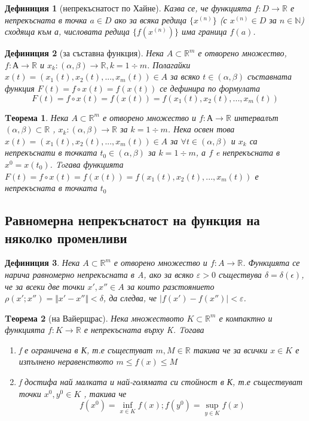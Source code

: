 \documentclass[fleqn,12pt]{article}
\newtheorem{theorem}{Tеорема}[subsection]
\newtheorem{definition}{Дефиниция}[subsection]
\begin{document}
\begin{definition}[непрекъснатост по Хайне]
Казва се, че функцията $f: D \to \mathbb{R}$ е непрекъсната в точка $a \in D$ ако за всяка редица  $\{x^{(n)}\}$ (с $x^{(n)} \in D$ за $n \in \mathbb{N}$) сходяща към а, числовата редица $\{f(x^{(n)})\}$ има граница $f(a)$. 
\end{definition}

\begin{definition}[за съставна функция]
Нека $A \subset \mathbb{R}^m$ е отворено множество, $f: А \to \mathbb{R}$ и $x_k: (\alpha, \beta) \to \mathbb{R}, k = 1 \div m$. Полагайки  $x(t) = (x_1(t), x_2(t), ... , x_m(t)) \in A$ за всяко $t \in (\alpha, \beta)$ съставната функция $F(t) = f \circ x(t) = f(x(t))$ се дефинира по формулата 
$$F(t) = f \circ x(t) = f(x(t)) = f(x_1(t), x_2(t), ... , x_m(t))$$
\end{definition}

\begin{theorem}
Нека $A \subset \mathbb{R}^m$ е отворено множество и $f: А \to \mathbb{R}$ интервалът $(\alpha, \beta) \subset \mathbb{R}$ , $x_k: (\alpha, \beta) \to \mathbb{R} $ за $k = 1 \div m$. Нека освен това $x(t) = (x_1(t), x_2(t), ... , x_m(t)) \in A$ за $\forall t \in (\alpha, \beta)$ и $x_k$ са непрекъснати в точката $t_0 \in (\alpha, \beta) $  за $k = 1 \div m$, а $f$ e непрекъсната в $x^0 = x(t_0)$. Toгава функцията $F(t) = f \circ x(t) = f(x(t)) = f(x_1(t), x_2(t), ... , x_m(t))$ е непрекъсната в точката $t_0$
\end{theorem}

\subsection{Равномерна непрекъснатост на функция на няколко променливи}
\begin{definition}
Нека $A \subset \mathbb{R}^m$ е отворено множество и $f: A \to \mathbb{R}$. Функцията се нарича равномерно непрекъсната в A, ако за  всяко $\varepsilon > 0$ съществува $\delta = \delta(\epsilon)$, че за всеки две точки $x', x'' \in A$ за които разстоянието $\rho(x';x'') =\Vert x' - x'' \Vert < \delta $, да следва, че $\vert f(x') - f(x'') \vert  < \varepsilon$.
\end{definition}

\begin{theorem}[на Вайерщрас]
Нека множеството $K \subset \mathbb{R}^m$ е компактно и функцията $f: K \to \mathbb{R}$ е непрекъсната върху K. Tогава 

\begin{enumerate}
		\item f е ограничена в К, т.е същестуват $m, M \in \mathbb{R}$ такива че за всички $x \in K$ е изпълнено неравенството
$m \leq f(x) \leq M$
		\item f достифа най малката и най-голямата си стойност в К, т.е съществуват точки $x^0, y^0 \in K$ , такива че
$$f(x^0) = \inf _{x \in K}f(x) ; f(y^0) = \sup_{y \in K} f(x)$$
\end{enumerate}

\end{theorem}
\end{document}

